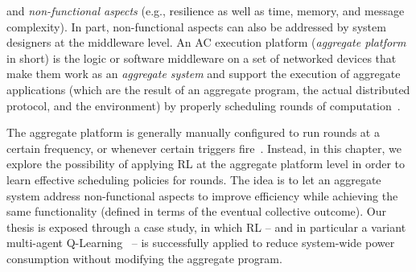  and \emph{non-functional aspects} (e.g., resilience as well as time, memory, and message complexity).
%
In part, non-functional aspects 
 can also be addressed by system designers
 at the middleware level.
%
An \ac{AC} execution platform (\emph{aggregate platform} in short) is the logic or software middleware 
 on a set of networked devices 
 that make them work as an \emph{aggregate system}
 and support the execution of aggregate applications (which are the result of an aggregate program, the actual distributed protocol, and the environment) by properly scheduling rounds of computation~\cite{DBLP:journals/fi/CasadeiPPVW20}. 

The aggregate platform is generally manually configured to run rounds at a certain frequency, or whenever certain triggers fire~\cite{danilo2021lmcs}.
%
Instead, in this chapter, 
 we explore the possibility of applying \ac{RL} at the aggregate platform level
 in order to learn effective scheduling policies for rounds.
%
The idea is to let an aggregate system
 address non-functional aspects  
 to improve efficiency %
 while 
 achieving the same functionality
 (defined in terms of the eventual collective outcome). 
%
Our thesis is exposed through a case study, in which \ac{RL} -- and in particular a variant multi-agent Q-Learning~\cite{DBLP:conf/icml/LauerR00} -- is successfully applied to reduce system-wide power consumption without modifying the aggregate program.   

%
%
%
%
